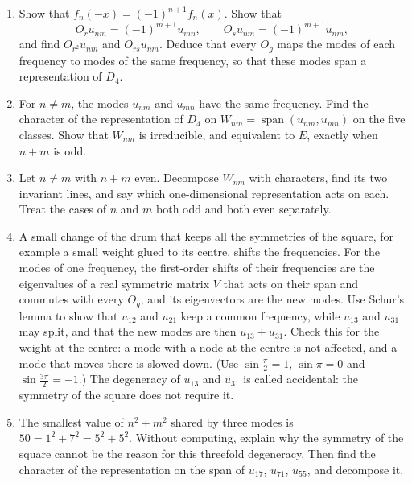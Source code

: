 \documentclass[11pt,a4paper]{article}
\DeclareMathOperator{\spn}{span}
\begin{document}
\begin{enumerate}
  \item Show that $f_n(-x) = (-1)^{n+1}f_n(x)$. Show that
  \[
    O_r u_{nm} = (-1)^{m+1}u_{mn}, \qquad O_s u_{nm} = (-1)^{m+1}u_{nm},
  \]
  and find $O_{r^2}u_{nm}$ and $O_{rs}u_{nm}$. Deduce that every $O_g$ maps the modes of each frequency to modes of the same frequency, so that these modes span a representation of $D_4$.
  \item For $n \ne m$, the modes $u_{nm}$ and $u_{mn}$ have the same frequency. Find the character of the representation of $D_4$ on $W_{nm} = \spn(u_{nm}, u_{mn})$ on the five classes. Show that $W_{nm}$ is irreducible, and equivalent to $E$, exactly when $n + m$ is odd.
  \item Let $n \ne m$ with $n + m$ even. Decompose $W_{nm}$ with characters, find its two invariant lines, and say which one-dimensional representation acts on each. Treat the cases of $n$ and $m$ both odd and both even separately.
  \item A small change of the drum that keeps all the symmetries of the square, for example a small weight glued to its centre, shifts the frequencies. For the modes of one frequency, the first-order shifts of their frequencies are the eigenvalues of a real symmetric matrix $V$ that acts on their span and commutes with every $O_g$, and its eigenvectors are the new modes. Use Schur's lemma to show that $u_{12}$ and $u_{21}$ keep a common frequency, while $u_{13}$ and $u_{31}$ may split, and that the new modes are then $u_{13} \pm u_{31}$. Check this for the weight at the centre: a mode with a node at the centre is not affected, and a mode that moves there is slowed down. (Use $\sin\frac{\pi}{2} = 1$, $\sin\pi = 0$ and $\sin\frac{3\pi}{2} = -1$.) The degeneracy of $u_{13}$ and $u_{31}$ is called accidental: the symmetry of the square does not require it.
  \item The smallest value of $n^2 + m^2$ shared by three modes is $50 = 1^2 + 7^2 = 5^2 + 5^2$. Without computing, explain why the symmetry of the square cannot be the reason for this threefold degeneracy. Then find the character of the representation on the span of $u_{17}$, $u_{71}$, $u_{55}$, and decompose it.
\end{enumerate}
\end{document}
